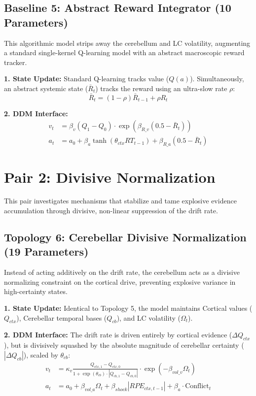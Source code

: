 ﻿\documentclass[12pt]{article}
\begin{document}
\subsection{Baseline 5: Abstract Reward Integrator (10 Parameters)}
This algorithmic model strips away the cerebellum and LC volatility, augmenting a standard single-kernel Q-learning model with an abstract macroscopic reward tracker.

\textbf{1. State Update:}
Standard Q-learning tracks value ($Q(a)$). Simultaneously, an abstract systemic state ($\bar{R}_t$) tracks the reward using an ultra-slow rate $\rho$:
\begin{equation}
    \bar{R}_t = (1 - \rho) \bar{R}_{t-1} + \rho R_t
\end{equation}

\textbf{2. DDM Interface:}
\begin{align}
    v_t &= \beta_v (Q_1 - Q_0) \cdot \exp\left(\beta_{R\_v}(0.5 - \bar{R}_t)\right) \\
    a_t &= a_0 + \beta_a \tanh(\theta_{ctx} RT_{t-1}) + \beta_{R\_a}(0.5 - \bar{R}_t)
\end{align}

\newpage

\section{Pair 2: Divisive Normalization}
This pair investigates mechanisms that stabilize and tame explosive evidence accumulation through divisive, non-linear suppression of the drift rate.

\subsection{Topology 6: Cerebellar Divisive Normalization (19 Parameters)}
Instead of acting additively on the drift rate, the cerebellum acts as a divisive normalizing constraint on the cortical drive, preventing explosive variance in high-certainty states.

\textbf{1. State Update:}
Identical to Topology 5, the model maintains Cortical values ($Q_{ctx}$), Cerebellar temporal bases ($Q_{cb}$), and LC volatility ($\Omega_t$).

\textbf{2. DDM Interface:}
The drift rate is driven entirely by cortical evidence ($\Delta Q_{ctx}$), but is divisively squashed by the absolute magnitude of cerebellar certainty ($|\Delta Q_{cb}|$), scaled by $\theta_{cb}$:
\begin{align}
    v_t &= \kappa_v \frac{Q_{ctx, 1} - Q_{ctx, 0}}{1 + \exp(\theta_{cb}) \cdot |Q_{cb, 1} - Q_{cb, 0}|} \cdot \exp(-\beta_{vol\_v}\Omega_t) \\
    a_t &= a_0 + \beta_{vol\_a}\Omega_t + \beta_{shock}|RPE_{ctx,t-1}| + \beta_a \cdot \text{Conflict}_t
\end{align}
\end{document}

